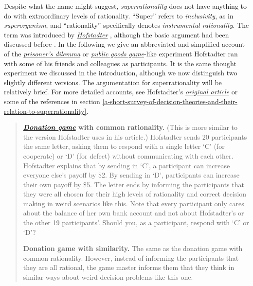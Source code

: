 Despite what the name might suggest, \emph{superrationality} does not
have anything to do with extraordinary levels of rationality. ``Super''
refers to \emph{inclusivity}, as in \emph{superorganism}, and
``rationality'' specifically denotes \emph{instrumental rationality}.
The term was introduced by
\href{https://en.wikipedia.org/wiki/Douglas_Hofstadter}{\emph{Hofstadter}}
\parencite{Hofstadter1983-az}, although the basic argument
had been discussed before
\parencite{Davis1977-iw,Horgan1981-hb}. In the following we
give an abbreviated and simplified account of the
\href{https://en.wikipedia.org/wiki/Prisoner\%27s_dilemma}{\emph{prisoner's
dilemma}} or
\href{https://en.wikipedia.org/wiki/Public_goods_game}{\emph{public
goods game}}-like experiment Hofstadter ran with some of his friends and
colleagues as participants. It is the same thought experiment we
discussed in the introduction, although we now distinguish two slightly
different versions. The argumentation for superrationality will be
relatively brief. For more detailed accounts, see Hofstadter's
\href{https://www.gwern.net/docs/1985-hofstadter\#dilemmas-for-superrational-thinkers-leading-up-to-a-luring-lottery}{\emph{original
article}} or some of the references in section
\ref{a-short-survey-of-decision-theories-and-their-relation-to-superrationality}.

\begin{quote}
\textbf{\href{https://en.wikipedia.org/wiki/Prisoner\%27s_dilemma\#Special_case:_Donation_game}{\emph{Donation
game}} with common rationality.} (This is more similar to the version
Hofstadter uses in his article.) Hofstadter sends 20 participants the
same letter, asking them to respond with a single letter `C' (for
cooperate) or `D' (for defect) without communicating with each other.
Hofstadter explains that by sending in `C', a participant can increase
everyone else's payoff by \$2. By sending in `D', participants can
increase their own payoff by \$5. The letter ends by informing the
participants that they were all chosen for their high levels of
rationality and correct decision making in weird scenarios like this.
Note that every participant only cares about the balance of her own bank
account and not about Hofstadter's or the other 19 participants'. Should
you, as a participant, respond with `C' or `D'?

\textbf{Donation game with similarity.} The same as the donation game
with common rationality. However, instead of informing the participants
that they are all rational, the game master informs them that they think
in similar ways about weird decision problems like this one.
\end{quote}

